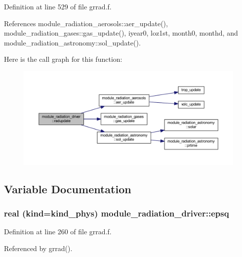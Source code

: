 Definition at line 529 of file grrad.\+f.



References module\+\_\+radiation\+\_\+aerosols\+::aer\+\_\+update(), module\+\_\+radiation\+\_\+gases\+::gas\+\_\+update(), iyear0, loz1st, month0, monthd, and module\+\_\+radiation\+\_\+astronomy\+::sol\+\_\+update().



Here is the call graph for this function\+:
\nopagebreak
\begin{figure}[H]
\begin{center}
\leavevmode
\includegraphics[width=350pt]{group__module__radiation__driver_gab34c4eb6e32fd200a6385ae70c5dab12_cgraph}
\end{center}
\end{figure}




\subsection{Variable Documentation}
\subsubsection[{\texorpdfstring{epsq}{epsq}}]{\setlength{\rightskip}{0pt plus 5cm}real (kind=kind\+\_\+phys) module\+\_\+radiation\+\_\+driver\+::epsq\hspace{0.3cm}{\ttfamily [private]}}\hypertarget{group__module__radiation__driver_ga0b0bf0fa8723b80d0891ec3327d187d7}{}\label{group__module__radiation__driver_ga0b0bf0fa8723b80d0891ec3327d187d7}


Definition at line 260 of file grrad.\+f.



Referenced by grrad().

